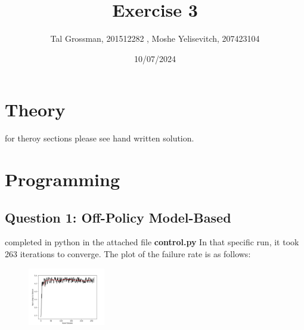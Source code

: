 \documentclass{assignmeownt}
\title{Exercise 3}
\author{Tal Grossman, 201512282 , Moshe Yelisevitch, 207423104}
\date{10/07/2024}
\begin{document}
\maketitle
\thispagestyle{firststyle}
\section{Theory}
for theroy sections please see hand written solution.







\newpage
\section{Programming}

\subsection{Question 1: Off-Policy Model-Based}
completed in python in the attached file \textbf{control.py}
\newline
In that specific run, it took 263 iterations to converge. The plot of the failure rate is as follows:
\begin{figure}[H]
    \centering
    \includegraphics[width=0.3\textwidth]{ex1_263_failure_plot.png}
\end{figure}
\end{document}
